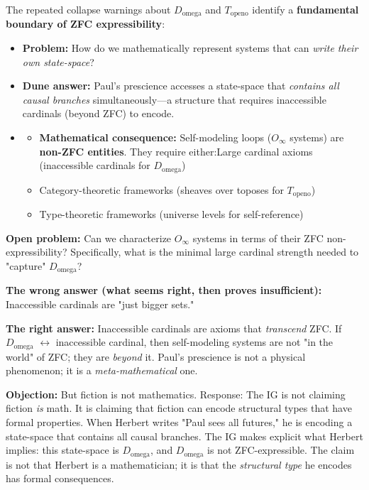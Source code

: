 \documentclass[12pt,a4paper]{article}
\begin{document}
The repeated collapse warnings about $D_{\text{omega}}$ and $T_{\text{openo}}$ identify a \textbf{fundamental boundary of ZFC expressibility}:

\begin{itemize}
    \item \textbf{Problem:} How do we mathematically represent systems that can \emph{write their own state-space}?
    \item \textbf{Dune answer:} Paul's prescience accesses a state-space that \emph{contains all causal branches} simultaneously---a structure that requires inaccessible cardinals (beyond ZFC) to encode.
    \item 
    \begin{itemize}
    \item \textbf{Mathematical consequence:} Self-modeling loops ($O_{\infty}$ systems) are \textbf{non-ZFC entities}. They require either:Large cardinal axioms (inaccessible cardinals for $D_{\text{omega}}$)
    \item Category-theoretic frameworks (sheaves over toposes for $T_{\text{openo}}$)
    \item Type-theoretic frameworks (universe levels for self-reference)
\end{itemize}

\end{itemize}

\textbf{Open problem:} Can we characterize $O_{\infty}$ systems in terms of their ZFC non-expressibility? Specifically, what is the minimal large cardinal strength needed to "capture" $D_{\text{omega}}$?

\textbf{The wrong answer (what seems right, then proves insufficient):} Inaccessible cardinals are "just bigger sets."

\textbf{The right answer:} Inaccessible cardinals are axioms that \emph{transcend} ZFC. If $D_{\text{omega}}$ $\leftrightarrow$ inaccessible cardinal, then self-modeling systems are not "in the world" of ZFC; they are \emph{beyond} it. Paul's prescience is not a physical phenomenon; it is a \emph{meta-mathematical} one.

\textbf{Objection:} But fiction is not mathematics. Response: The IG is not claiming fiction \emph{is} math. It is claiming that fiction can encode structural types that have formal properties. When Herbert writes "Paul sees all futures," he is encoding a state-space that contains all causal branches. The IG makes explicit what Herbert implies: this state-space is $D_{\text{omega}}$, and $D_{\text{omega}}$ is not ZFC-expressible. The claim is not that Herbert is a mathematician; it is that the \emph{structural type} he encodes has formal consequences.
\end{document}
